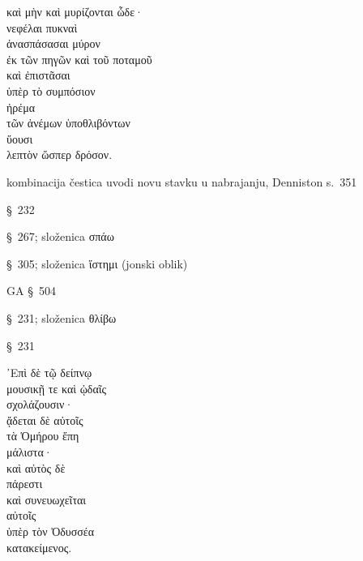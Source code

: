 {\large
\begin{greek}
\noindent καὶ μὴν καὶ μυρίζονται ὧδε· \\
νεφέλαι πυκναὶ \\
\tabto{2em} ἀνασπάσασαι μύρον \\
\tabto{4em} ἐκ τῶν πηγῶν καὶ τοῦ ποταμοῦ \\
\tabto{2em} καὶ ἐπιστᾶσαι \\
\tabto{4em} ὑπὲρ τὸ συμπόσιον \\
ἠρέμα \\
\tabto{2em} τῶν ἀνέμων ὑποθλιβόντων \\
ὕουσι \\
λεπτὸν ὥσπερ δρόσον.\\

\end{greek}
}

\begin{description}[noitemsep]
\item[καὶ μὴν καὶ] kombinacija čestica uvodi novu stavku u nabrajanju, Denniston s.~351
\item[μυρίζονται] §~232
\item[ἀνασπάσασαι] §~267; složenica σπάω
\item[ἐπιστᾶσαι] §~305; složenica ἵστημι (jonski oblik)
\item[τῶν ἀνέμων ὑποθλιβόντων] GA §~504
\item[ὑποθλιβόντων] §~231; složenica θλίβω
\item[ὕουσι] §~231
\end{description}




{\large
\begin{greek}
\noindent ᾿Επὶ δὲ τῷ δείπνῳ \\
\tabto{2em} μουσικῇ τε καὶ ᾠδαῖς \\
σχολάζουσιν· \\
ᾄδεται δὲ αὐτοῖς \\
τὰ Ὁμήρου ἔπη \\
\tabto{2em} μάλιστα· \\
καὶ αὐτὸς δὲ \\
πάρεστι \\
καὶ συνευωχεῖται \\
\tabto{2em} αὐτοῖς \\
\tabto{2em} ὑπὲρ τὸν Ὀδυσσέα \\
κατακείμενος. \\

\end{greek}
}

